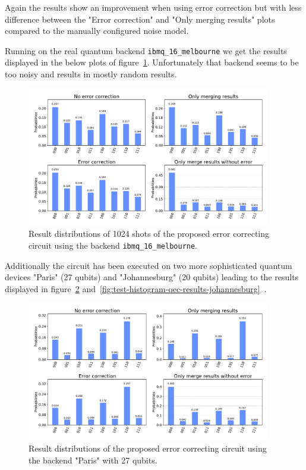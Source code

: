 Again the results show an improvement when using error correction but with less difference between the "Error correction" and "Only merging results" plots compared to the manually configured noise model.

Running on the real quantum backend \texttt{ibmq\_16\_melbourne} we get the results displayed in the below plots of figure~\ref{fig:test-histogram-qec-results-noise-model-melbourne}.
Unfortunately that backend seems to be too noisy and results in mostly random results.

\begin{figure}[H]
    \centering
    \includegraphics[width=0.95\textwidth]{res/test-histogram-qec-results-melbourne.pdf}
    \caption{Result distributions of 1024 shots of the proposed error correcting circuit using the backend \texttt{ibmq\_16\_melbourne}.}
    \label{fig:test-histogram-qec-results-noise-model-melbourne}
\end{figure}

Additionally the circuit has been executed on two more sophisticated quantum devices "Paris" (27 qubits) and "Johannesburg" (20 qubits) leading to the results displayed in figure~\ref{fig:test-histogram-qec-results-paris} and~\ref{fig:test-histogram-qec-results-johannesburg}~\cite{IBMQAvailableSystems}.

\begin{figure}[H]
    \centering
    \includegraphics[width=0.95\textwidth]{res/test-histogram-qec-results-paris.pdf}
    \caption{Result distributions of the proposed error correcting circuit using the backend "Paris" with 27 qubits.}
    \label{fig:test-histogram-qec-results-paris}
\end{figure}

